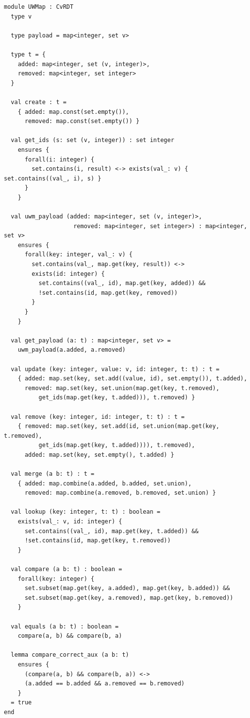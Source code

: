 \begin{lstlisting}[caption={\texttt{UWMap}}, label={lst:app_uwmap}]
module UWMap : CvRDT
  type v

  type payload = map<integer, set v>

  type t = {
    added: map<integer, set (v, integer)>,
    removed: map<integer, set integer>
  }

  val create : t =
    { added: map.const(set.empty()),
      removed: map.const(set.empty()) }

  val get_ids (s: set (v, integer)) : set integer
    ensures {
      forall(i: integer) {
        set.contains(i, result) <-> exists(val_: v) { set.contains((val_, i), s) }
      }
    }

  val uwm_payload (added: map<integer, set (v, integer)>,
                    removed: map<integer, set integer>) : map<integer, set v>
    ensures {
      forall(key: integer, val_: v) {
        set.contains(val_, map.get(key, result)) <->
        exists(id: integer) {
          set.contains((val_, id), map.get(key, added)) &&
          !set.contains(id, map.get(key, removed))
        }
      }
    }

  val get_payload (a: t) : map<integer, set v> =
    uwm_payload(a.added, a.removed)

  val update (key: integer, value: v, id: integer, t: t) : t =
    { added: map.set(key, set.add((value, id), set.empty()), t.added),
      removed: map.set(key, set.union(map.get(key, t.removed),
          get_ids(map.get(key, t.added))), t.removed) }

  val remove (key: integer, id: integer, t: t) : t =
    { removed: map.set(key, set.add(id, set.union(map.get(key, t.removed),
          get_ids(map.get(key, t.added)))), t.removed),
      added: map.set(key, set.empty(), t.added) }

  val merge (a b: t) : t =
    { added: map.combine(a.added, b.added, set.union),
      removed: map.combine(a.removed, b.removed, set.union) }

  val lookup (key: integer, t: t) : boolean =
    exists(val_: v, id: integer) {
      set.contains((val_, id), map.get(key, t.added)) &&
      !set.contains(id, map.get(key, t.removed))
    }

  val compare (a b: t) : boolean =
    forall(key: integer) {
      set.subset(map.get(key, a.added), map.get(key, b.added)) &&
      set.subset(map.get(key, a.removed), map.get(key, b.removed))
    }

  val equals (a b: t) : boolean =
    compare(a, b) && compare(b, a)

  lemma compare_correct_aux (a b: t)
    ensures {
      (compare(a, b) && compare(b, a)) <->
      (a.added == b.added && a.removed == b.removed)
    }
  = true
end
\end{lstlisting}

